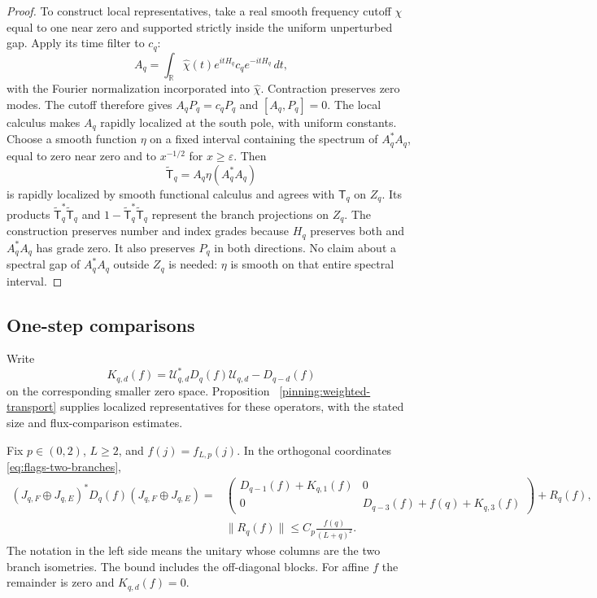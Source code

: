 \begin{proof}
To construct local representatives, take a real smooth frequency cutoff
$\chi$ equal to one near zero and supported strictly inside the uniform
unperturbed gap.  Apply its time filter to $c_q$:
\[
 A_q=\int_{\mathbb R}\widehat\chi(t)
          e^{itH_q}c_qe^{-itH_q}\,dt,
\]
with the Fourier normalization incorporated into $\widehat\chi$.
Contraction preserves zero modes.  The cutoff therefore gives
$A_qP_q=c_qP_q$ and $[A_q,P_q]=0$.  The local calculus makes $A_q$
rapidly localized at the south pole, with uniform constants.  Choose a
smooth function $\eta$ on a fixed interval containing the spectrum of
$A_q^*A_q$, equal to zero near zero and to $x^{-1/2}$ for
$x\geq\varepsilon$.  Then
\[
 \widetilde{\mathsf T}_q=A_q\eta(A_q^*A_q)
\]
is rapidly localized by smooth functional calculus and agrees with
$\mathsf T_q$ on $Z_q$.  Its products
$\widetilde{\mathsf T}_q^*\widetilde{\mathsf T}_q$ and
$1-\widetilde{\mathsf T}_q^*\widetilde{\mathsf T}_q$ represent the branch projections on
$Z_q$.  The construction preserves number and index grades because
$H_q$ preserves both and $A_q^*A_q$ has grade zero.  It also preserves
$P_q$ in both directions.  No claim about a spectral gap of
$A_q^*A_q$ outside $Z_q$ is needed: $\eta$ is smooth on that entire
spectral interval.
\end{proof}

\subsection{One-step comparisons}

Write
\[
 K_{q,d}(f)=\mathcal U_{q,d}^*D_q(f)\mathcal U_{q,d}
              -D_{q-d}(f)
\]
on the corresponding smaller zero space.  Proposition~
\ref{pinning:weighted-transport} supplies localized representatives for
these operators, with the stated size and flux-comparison estimates.

\begin{proposition}
\label{prop:flags-weighted-step}
Fix $p\in(0,2)$, $L\geq2$, and $f(j)=f_{L,p}(j)$.  In the orthogonal
coordinates \eqref{eq:flags-two-branches},
\begin{equation}
 \begin{split}
 (J_{q,F}\oplus J_{q,E})^*D_q(f)(J_{q,F}\oplus J_{q,E})
  ={}&\begin{pmatrix}
   D_{q-1}(f)+K_{q,1}(f)&0\\
   0&D_{q-3}(f)+f(q)+K_{q,3}(f)
  \end{pmatrix}+R_q(f),\\
 &\|R_q(f)\|\leq C_p\frac{f(q)}{(L+q)^2}.
 \end{split}
 \label{eq:flags-weighted-step}
\end{equation}
The notation in the left side means the unitary whose columns are the
two branch isometries.  The bound includes the off-diagonal blocks.
For affine $f$ the remainder is zero and $K_{q,d}(f)=0$.
\end{proposition}

